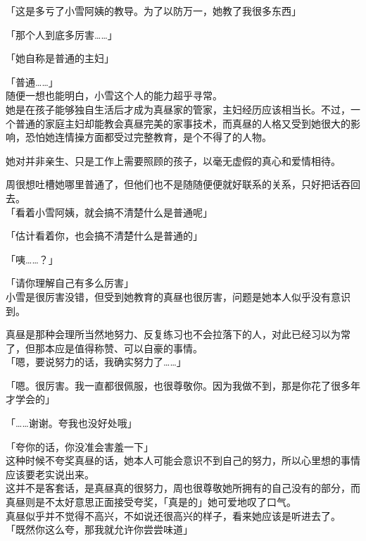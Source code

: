 「这是多亏了小雪阿姨的教导。为了以防万一，她教了我很多东西」

「那个人到底多厉害……」

「她自称是普通的主妇」

%
「普通……」\\

随便一想也能明白，小雪这个人的能力超乎寻常。\\

她是在孩子能够独自生活后才成为真昼家的管家，主妇经历应该相当长。不过，一个普通的家庭主妇却能教会真昼完美的家事技术，而真昼的人格又受到她很大的影响，恐怕她连情操方面都受过完整教育，是个不得了的人物。

她对并非亲生、只是工作上需要照顾的孩子，以毫无虚假的真心和爱情相待。

周很想吐槽她哪里普通了，但他们也不是随随便便就好联系的关系，只好把话吞回去。\\

「看着小雪阿姨，就会搞不清楚什么是普通呢」

「估计看着你，也会搞不清楚什么是普通的」

「咦……？」

「请你理解自己有多么厉害」\\

小雪是很厉害没错，但受到她教育的真昼也很厉害，问题是她本人似乎没有意识到。

真昼是那种会理所当然地努力、反复练习也不会拉落下的人，对此已经习以为常了，但那本应是值得称赞、可以自豪的事情。\\

「嗯，要说努力的话，我确实努力了……」

「嗯。很厉害。我一直都很佩服，也很尊敬你。因为我做不到，那是你花了很多年才学会的」

「……谢谢。夸我也没好处哦」

「夸你的话，你没准会害羞一下」\\

这种时候不夸奖真昼的话，她本人可能会意识不到自己的努力，所以心里想的事情应该要老实说出来。\\

这并不是客套话，是真昼真的很努力，周也很尊敬她所拥有的自己没有的部分，而真昼则是不太好意思正面接受夸奖，「真是的」她可爱地叹了口气。\\

真昼似乎并不觉得不高兴，不如说还很高兴的样子，看来她应该是听进去了。\\

「既然你这么夸，那我就允许你尝尝味道」\\


